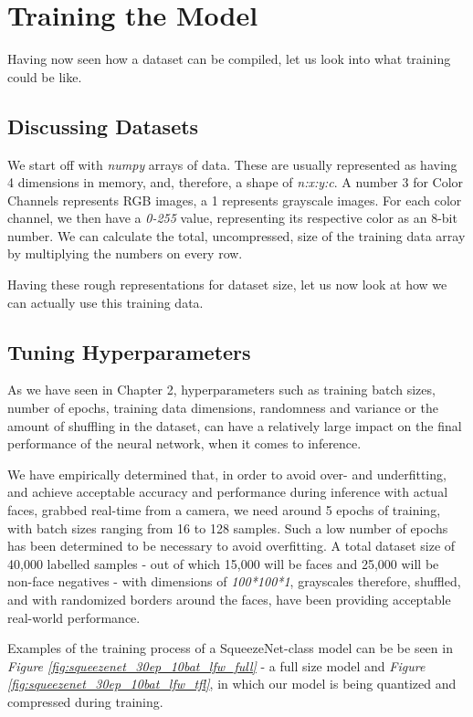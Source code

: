 \section{Training the Model}
Having now seen how a dataset can be compiled, let us look into what training could be like. 
\subsection{Discussing Datasets}
We start off with \textit{numpy} arrays of data. These are usually represented as having 4 dimensions in memory, and, therefore, a shape of \textit{n:x:y:c}. A number 3 for Color Channels represents RGB images, a 1 represents grayscale images. For each color channel, we then have a \textit{0-255} value, representing its respective color as an 8-bit number. We can calculate the total, uncompressed, size of the training data array by multiplying the numbers on every row. \par
Having these rough representations for dataset size, let us now look at how we can actually use this training data.


\subsection{Tuning Hyperparameters}
As we have seen in Chapter 2, hyperparameters such as training batch sizes, number of epochs, training data dimensions, randomness and variance or the amount of shuffling in the dataset, can have a relatively large impact on the final performance of the neural network, when it comes to inference. \par
We have empirically determined that, in order to avoid over- and underfitting, and achieve acceptable accuracy and performance during inference with actual faces, grabbed real-time from a camera, we need around 5 epochs of training, with batch sizes ranging from 16 to 128 samples. Such a low number of epochs has been determined to be necessary to avoid overfitting. A total dataset size of 40,000 labelled samples - out of which 15,000 will be faces and 25,000 will be non-face negatives - with dimensions of \textit{100*100*1}, grayscales therefore, shuffled, and with randomized borders around the faces, have been providing acceptable real-world performance. \par
Examples of the training process of a SqueezeNet-class model can be be seen in \textit{Figure \ref{fig:squeezenet_30ep_10bat_lfw_full}} - a full size model and \textit{Figure \ref{fig:squeezenet_30ep_10bat_lfw_tfl}}, in which our model is being quantized and compressed during training.


